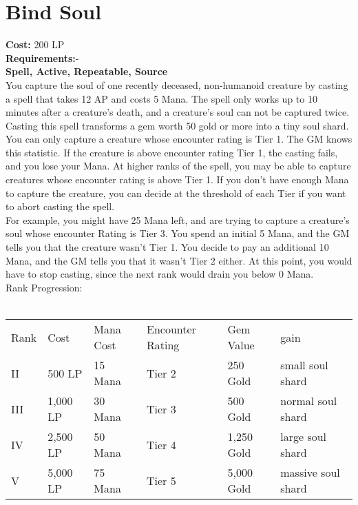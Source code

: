 \section{Bind Soul}\label{spell:bindSoul}
\textbf{Cost:} 200 LP\\
\textbf{Requirements:}-\\
\textbf{Spell, Active, Repeatable, Source}\\
You capture the soul of one recently deceased, non-humanoid creature by casting a spell that takes 12 AP and costs 5 Mana.
The spell only works up to 10 minutes after a creature's death, and a creature's soul can not be captured twice.
Casting this spell transforms a gem worth 50 gold or more into a tiny soul shard.\\
You can only capture a creature whose encounter rating is Tier 1.
The GM knows this statistic.
If the creature is above encounter rating Tier 1, the casting fails, and you lose your Mana.
At higher ranks of the spell, you may be able to capture creatures whose encounter rating is above Tier 1.
If you don't have enough Mana to capture the creature, you can decide at the threshold of each Tier if you want to abort casting the spell.\\
For example, you might have 25 Mana left, and are trying to capture a creature's soul whose encounter Rating is Tier 3.
You spend an initial 5 Mana, and the GM tells you that the creature wasn't Tier 1.
You decide to pay an additional 10 Mana, and the GM tells you that it wasn't Tier 2 either.
At this point, you would have to stop casting, since the next rank would drain you below 0 Mana.
\\
Rank Progression:\\
\\
\begin{longtable}{l | l | l | l | l | l}
    Rank & Cost & Mana Cost & Encounter Rating & Gem Value & gain\\
    II & 500 LP& 15 Mana & Tier 2 & 250 Gold & small soul shard\\
    III & 1,000 LP & 30 Mana & Tier 3 & 500 Gold & normal soul shard\\
    IV & 2,500 LP & 50 Mana & Tier 4 & 1,250 Gold & large soul shard\\
    V & 5,000 LP & 75 Mana & Tier 5 & 5,000 Gold & massive soul shard\\
\end{longtable}